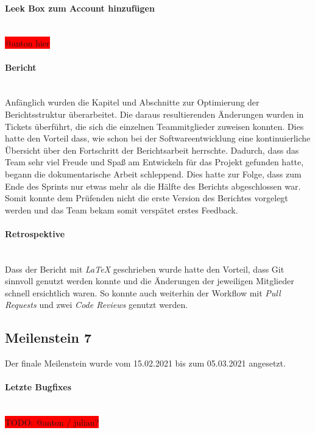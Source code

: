 \documentclass[10pt, a4paper]{article}
\begin{document}
\begin{onehalfspace}
\paragraph*{Leek Box zum Account hinzufügen} $~$ \\
\colorbox{red}{@anton hier}

\paragraph*{Bericht} $~$ \\
Anfänglich wurden die Kapitel und Abschnitte zur Optimierung der Berichtsstruktur überarbeitet.
Die daraus resultierenden Änderungen wurden in Tickets überführt, die sich die einzelnen Teammitglieder zuweisen konnten.
Dies hatte den Vorteil dass, wie schon bei der Softwareentwicklung eine kontinuierliche Übersicht über den Fortschritt der Berichtsarbeit herrschte.
Dadurch, dass das Team sehr viel Freude und Spaß am Entwickeln für das Projekt gefunden hatte, begann die dokumentarische Arbeit schleppend.
Dies hatte zur Folge, dass zum Ende des Sprints nur etwas mehr als die Hälfte des Berichts abgeschlossen war. Somit konnte dem Prüfenden nicht die erste Version des Berichtes vorgelegt werden und das Team bekam somit verspätet erstes Feedback.

\paragraph*{Retrospektive} $~$ \\
Dass der Bericht mit \textit{LaTeX} geschrieben wurde hatte den Vorteil, dass Git sinnvoll genutzt werden konnte und die Änderungen der jeweiligen Mitglieder schnell ersichtlich waren.
So konnte auch weiterhin der Workflow mit \textit{Pull Requests} und zwei \textit{Code Reviews} genutzt werden.

\subsection{Meilenstein 7}
Der finale Meilenstein wurde vom 15.02.2021 bis zum 05.03.2021 angesetzt.

\paragraph*{Letzte Bugfixes} $~$ \\
\colorbox{red}{TODO: @anton / julian?}


\end{onehalfspace}
\end{document}
